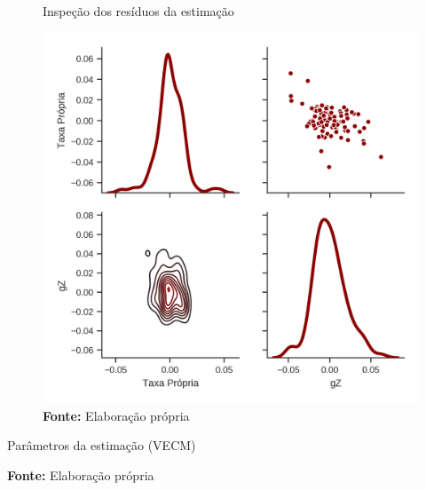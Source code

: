 \begin{figure}[H]
	\centering
	\caption{Inspeção dos resíduos da estimação}
	\label{residuos}
	\includegraphics[height=.4\textheight]{../../Modelo/SeriesTemporais/figs/Residuos_4VECM.png}
	\caption*{\textbf{Fonte:} Elaboração própria}
\end{figure}

\begin{table}[htb]
\centering
	\caption{Parâmetros da estimação (VECM)}

\caption*{\textbf{Fonte:} Elaboração própria}
\end{table}


